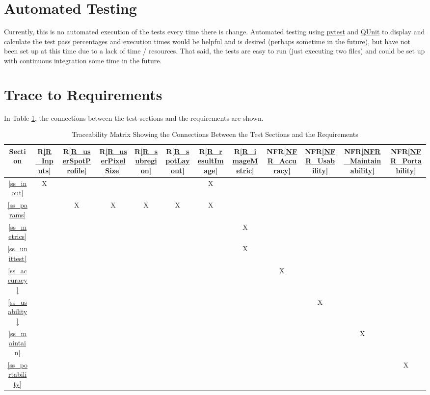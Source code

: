 \documentclass[12pt, titlepage]{article}
\newcommand{\rref}[1]{R\ref{#1}}
\newcommand{\nfrref}[1]{NFR\ref{#1}}
\begin{document}
\section{Automated Testing}
Currently, this is no automated execution of the tests every time there is change.
Automated testing using \href{https://pytest.org}{pytest} and \href{https://qunitjs.com}{QUnit}
to display and calculate the test pass percentages and execution times would be helpful
and is desired (perhaps sometime in the future),
but have not been set up at this time due to a lack of time / resources.
That said, the tests are easy to run (just executing two files)
and could be set up with continuous integration some time in the future.


\section{Trace to Requirements}
In Table \ref{Table:R_trace}, the connections between the test sections and the requirements are shown.

\begin{table}[h]
  \centering
  \begin{tabular}{|c|c|c|c|c|c|c|c|c|c|c|c|}
      \hline
      Section &
      \rref{R_Inputs} & \rref{R_userSpotProfile} & \rref{R_userPixelSize}
      & \rref{R_subregion} & \rref{R_spotLayout} & \rref{R_resultImage} &
      \rref{R_imageMetric} &
      \nfrref{NFR_Accuracy} &
      \nfrref{NFR_Usability} &
      \nfrref{NFR_Maintainability} &
      \nfrref{NFR_Portability}
      \\
      \hline
       \ref{ss_inout}        &X& & & & &X& & & & & \\ \hline
       \ref{ss_params}       & &X&X&X&X&X& & & & & \\ \hline
       \ref{ss_metrics}      & & & & & & &X& & & & \\ \hline
       \ref{ss_unittest}     & & & & & & &X& & & & \\ \hline
       \ref{ss_accuracy}     & & & & & & & &X& & & \\ \hline
       \ref{ss_usability}    & & & & & & & & &X& & \\ \hline
       \ref{ss_maintain}     & & & & & & & & & &X& \\ \hline
       \ref{ss_portability}  & & & & & & & & & & &X\\ \hline
  \end{tabular}
  \caption{Traceability Matrix Showing the Connections Between the Test Sections
    and the Requirements}
  \label{Table:R_trace}
\end{table}
\end{document}
